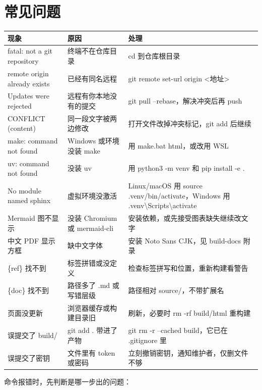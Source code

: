 \documentclass[UTF8,fontset=none,a4paper,11pt]{ctexart}
\newcommand{\code}[1]{{\CJKsetecglue{}\ttfamily #1}}
\begin{document}
\section{常见问题}\label{sec:faq}

{\small
\setlength{\tabcolsep}{4pt}
\begin{longtable}{@{}L{4.2cm}L{4.1cm}L{6.6cm}@{}}
\toprule
现象 & 原因 & 处理 \\
\midrule
\endhead
\code{fatal: not a git repository} & 终端不在仓库目录 & \code{cd} 到仓库根目录 \\
\code{remote origin already exists} & 已经有同名远程 & \code{git remote set-url origin <地址>} \\
\code{Updates were rejected} & 远程有你本地没有的提交 & \code{git pull --rebase}，解决冲突后再 push \\
\code{CONFLICT (content)} & 同一段文字被两边修改 & 打开文件改掉冲突标记，\code{git add} 后继续 \\
\code{make: command not found} & Windows 或环境没装 make & 用 \code{make.bat html}，或改用 WSL \\
\code{uv: command not found} & 没装 uv & 用 \code{python3 -m venv} 和 \code{pip install -e .} \\
\code{No module named sphinx} & 虚拟环境没激活 & Linux/macOS 用 \code{source .venv/bin/activate}，Windows 用 \code{.venv\textbackslash{}Scripts\textbackslash{}activate} \\
Mermaid 图不显示 & 没装 Chromium 或 mermaid-cli & 安装依赖，或先接受图表缺失继续改文字 \\
中文 PDF 显示方框 & 缺中文字体 & 安装 Noto Sans CJK，见 build-docs 附录 \\
\code{\{ref\}} 找不到 & 标签拼错或没定义 & 检查标签拼写和位置，重新构建看警告 \\
\code{\{doc\}} 找不到 & 路径多了 \code{.md} 或写错层级 & 路径相对 \code{source/}，不带扩展名 \\
页面没更新 & 浏览器缓存或构建目录旧 & 刷新，必要时 \code{rm -rf build/html} 重构建 \\
误提交了 \code{build/} & \code{git add .} 带进了产物 & \code{git rm -r --cached build}，它已在 \code{.gitignore} 里 \\
误提交了密钥 & 文件里有 token 或密码 & 立刻撤销密钥，通知维护者，仅删文件不够 \\
\bottomrule
\end{longtable}
}

命令报错时，先判断是哪一步出的问题：
\end{document}
